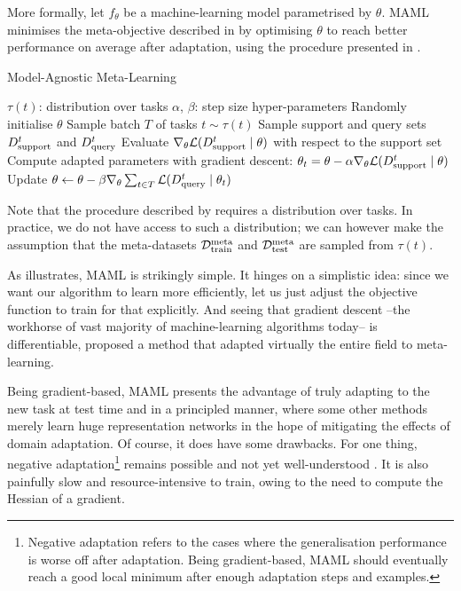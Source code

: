 \documentclass[11pt]{article}
\numberwithin{equation}{subsection}
\begin{document}
More formally, let $f_\theta$ be a machine-learning model parametrised by $\theta$. MAML minimises the meta-objective described in  by optimising $\theta$ to reach better performance on average after adaptation, using the procedure presented in .

\begin{algorithm}[ht]
  \caption{Model-Agnostic Meta-Learning \citep{finn2017model}}
  \label{algo:maml}
  \begin{algorithmic}[1]
    \REQUIRE $\tau(t)$: distribution over tasks
    \REQUIRE $\alpha$, $\beta$: step size hyper-parameters
    \STATE Randomly initialise $\theta$
      \STATE Sample batch $T$ of tasks $t \sim \tau(t)$
        \STATE Sample support and query sets ${D_{\mathrm{support}}^t}$ and ${D_{\mathrm{query}}^t}$
        \STATE Evaluate $\nabla_\theta \mathcal{L}({D_{\mathrm{support}}^t} \mid \theta)$ with respect to the support set
        \STATE Compute adapted parameters with gradient descent:
        $\theta_t=\theta-\alpha \nabla_\theta \mathcal{L}({D_{\mathrm{support}}^t} \mid \theta)$
      \ENDFOR
      \STATE Update $\theta \leftarrow \theta - \beta \nabla_\theta \sum_{t \in T}  \mathcal{L}({D_{\mathrm{query}}^t} \mid \theta_t)$
    \ENDWHILE
  \end{algorithmic}
\end{algorithm}

Note that the procedure described by  requires a distribution over tasks. In practice, we do not have access to such a distribution; we can however make the assumption that the meta-datasets ${\mathcal{D}_\mathrm{train}^\mathrm{meta}}$ and ${\mathcal{D}_\mathrm{test}^\mathrm{meta}}$ are sampled from $\tau(t)$.

As  illustrates, MAML is strikingly simple. It hinges on a simplistic idea: since we want our algorithm to learn more efficiently, let us just adjust the objective function to train for that explicitly. And seeing that gradient descent –the workhorse of vast majority of machine-learning algorithms today– is differentiable, \citeauthor{finn2017model} proposed a method that adapted virtually the entire field to meta-learning.

Being gradient-based, MAML presents the advantage of truly adapting to the new task at test time and in a principled manner, where some other methods merely learn huge representation networks in the hope of mitigating the effects of domain adaptation. Of course, it does have some drawbacks. For one thing, negative adaptation\footnote{Negative adaptation refers to the cases where the generalisation performance is worse off after adaptation. Being gradient-based, MAML should eventually reach a good local minimum after enough adaptation steps and examples.} remains possible and not yet well-understood \citep{deleu2018effects}. It is also painfully slow and resource-intensive to train, owing to the need to compute the Hessian of a gradient.
\end{document}
